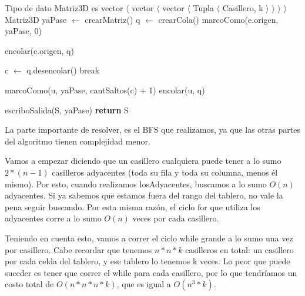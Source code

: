 \begin{pseudo}
\State Tipo de dato Matriz3D es vector $\langle$ vector $\langle$ vector $\langle$ Tupla $\langle$ Casillero, k $\rangle$ $\rangle$ $\rangle$ $\rangle$
        \State Matriz3D yaPase $\leftarrow$ crearMatriz() 
		\State q $\leftarrow$ crearCola() 
		\State marcoComo(e.origen, yaPase, 0) 
		
		\State encolar(e.origen, q) 
		
		 
			\State c $\leftarrow$ q.desencolar() 
				\State break
			\EndIf
			
			 
			     
					\State marcoComo(u, yaPase, cantSaltos(c) + 1) 
					\State encolar(u, q) 
				\EndIf
      		\EndFor
		\EndWhile

      	\State escriboSalida(S, yaPase) 
      	\State \textbf{return} S
        
    \EndProcedure
\end{pseudo}

La parte importante de resolver, es el BFS que realizamos, ya que las otras partes del algoritmo tienen complejidad menor.

Vamos a empezar diciendo que un casillero cualquiera puede tener a lo sumo $2*(n-1)$ casilleros adyacentes (toda su fila y toda su columna, menos él mismo). Por esto, cuando realizamos losAdyacentes, buscamos a lo sumo $O(n)$ adyacentes. Si ya sabemos que estamos fuera del rango del tablero, no vale la pena seguir buscando. Por esta misma razón, el ciclo for que utiliza los adyacentes corre a lo sumo $O(n)$ veces por cada casillero.

Teniendo en cuenta esto, vamos a correr el ciclo while grande a lo sumo una vez por casillero. Cabe recordar que tenemos $n*n*k$ casilleros en total: un casillero por cada celda del tablero, y ese tablero lo tenemos k veces. Lo peor que puede suceder es tener que correr el while para cada casillero, por lo que tendríamos un costo total de $O(n*n*n*k)$, que es igual a $O(n^3*k)$.

